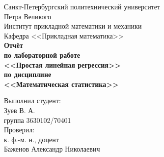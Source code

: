 \documentclass[report1.tex]{subfiles}
\begin{document}
\begin{titlepage}
\begin{center}
	\begin{large}
		Санкт-Петербургский политехнический университет\\
		Петра Великого \\ 
		\vspace{\baselineskip}
		Институт прикладной математики и механики\\
		Кафедра <<Прикладная математика>>\\
	\vfill
	\textbf{Отчёт\\
		по лабораторной работе \\
		<<Простая линейная регрессия>>\\
		по дисциплине\\
		<<Математическая статистика>>}
	\end{large}
\end{center}
\vfill
\flushleft
{\addtolength{\leftskip}{\linewidth / 2}
	Выполнил студент:\\
	Зуев В. А.\\
	группа 3630102/70401\\
	Проверил:\\
	к. ф.-м. н., доцент\\
	Баженов Александр Николаевич\\
}
\vfill
{}
\end{titlepage}
\end{document}
